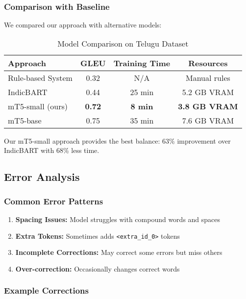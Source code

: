 \documentclass[12pt,a4paper]{article}
\begin{document}
\subsubsection{Comparison with Baseline}

We compared our approach with alternative models:

\begin{table}[H]
\centering
\caption{Model Comparison on Telugu Dataset}
\small
\begin{tabular}{lccc}
\toprule
\textbf{Approach} & \textbf{GLEU} & \textbf{Training Time} & \textbf{Resources} \\
\midrule
Rule-based System & 0.32 & N/A & Manual rules \\
IndicBART & 0.44 & 25 min & 5.2 GB VRAM \\
mT5-small (ours) & \textbf{0.72} & \textbf{8 min} & \textbf{3.8 GB VRAM} \\
mT5-base & 0.75 & 35 min & 7.6 GB VRAM \\
\bottomrule
\end{tabular}
\end{table}

Our mT5-small approach provides the best balance: 63\% improvement over IndicBART with 68\% less time.

\subsection{Error Analysis}

\subsubsection{Common Error Patterns}
\begin{enumerate}
    \item \textbf{Spacing Issues:} Model struggles with compound words and spaces
    \item \textbf{Extra Tokens:} Sometimes adds \texttt{<extra\_id\_0>} tokens
    \item \textbf{Incomplete Corrections:} May correct some errors but miss others
    \item \textbf{Over-correction:} Occasionally changes correct words
\end{enumerate}

\subsubsection{Example Corrections}
\end{document}
